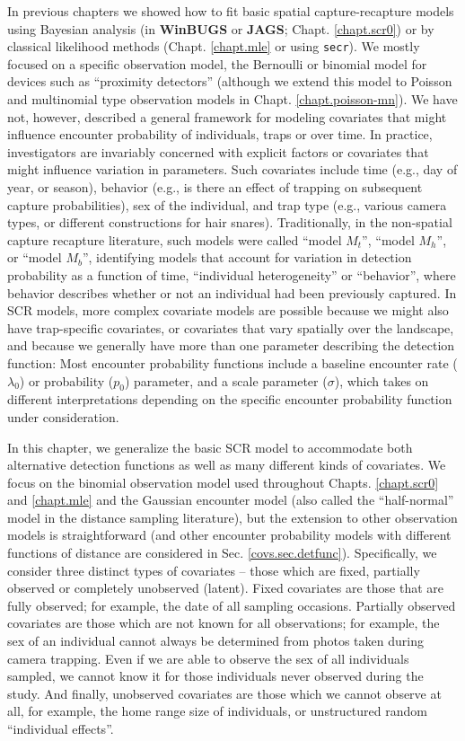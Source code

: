 In previous chapters we showed how to fit basic spatial
capture-recapture models using Bayesian analysis (in {\bf WinBUGS} or
{\bf JAGS};
Chapt. \ref{chapt.scr0}) or by classical likelihood methods
(Chapt. \ref{chapt.mle} or using \mbox{\tt secr}). We mostly focused
on a specific observation model, the Bernoulli or binomial model for
devices such as ``proximity detectors'' (although we extend this model to
Poisson and multinomial type observation models in Chapt. \ref{chapt.poisson-mn}).
 We have not, however,
described a general framework for modeling covariates that might
influence encounter probability of individuals, traps or over time.
In practice, 
investigators are invariably concerned
with explicit factors or covariates that might influence variation in
parameters. Such covariates
include time (e.g., day of year, or season), behavior (e.g., is there an 
effect of trapping on subsequent capture probabilities), sex of the individual, and trap
type (e.g., various camera types, or different constructions for hair
snares). Traditionally, in the non-spatial capture recapture
literature, such models were called ``model $M_t$'', ``model
$M_h$'', or ``model $M_b$'', identifying models that account for
variation in detection probability as a function of time, ``individual
heterogeneity'' or ``behavior'', where behavior describes
whether or not an individual had been previously captured. In SCR
models, more complex covariate models are possible because we might
also have trap-specific covariates, or covariates that vary spatially
over the landscape, and because we generally have more than one 
parameter describing the detection function:
Most encounter probability functions include a baseline encounter
rate ($\lambda_0$) or probability ($p_0$) parameter, and a scale parameter
($\sigma$), which takes on different interpretations depending on
the specific encounter probability function under consideration. 

In this chapter, we generalize the basic SCR model to accommodate both 
alternative detection functions as well as
many different kinds of covariates. We focus on the binomial observation
model used throughout Chapts. \ref{chapt.scr0} and \ref{chapt.mle} and
the Gaussian encounter model (also called the ``half-normal'' model in
the distance sampling literature), 
but the extension to other observation models is
straightforward (and other encounter probability models with different functions
of distance are considered in Sec. \ref{covs.sec.detfunc}). 
Specifically, we consider three distinct types of
covariates -- those which are fixed, partially observed or completely
unobserved (latent).  Fixed covariates are those that are fully
observed; for example, the date of all sampling occasions.  Partially
observed covariates are those which are not known for all
observations; for example, the sex of an individual cannot always be
determined from photos taken during camera trapping.  Even if we are
able to observe the sex of all individuals sampled, we cannot know it
for those individuals never observed during the study.  And finally,
unobserved covariates are those which we cannot observe at all, for
example, the home range size of individuals, or unstructured random
``individual effects''.


